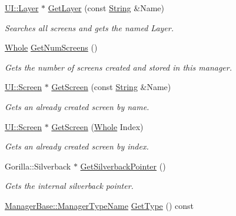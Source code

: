 \begin{DoxyCompactItemize}
\hyperlink{classMezzanine_1_1UI_1_1Layer}{UI::Layer} $\ast$ \hyperlink{classMezzanine_1_1UIManager_abdd684382023792153add6c5766c9e4c}{GetLayer} (const \hyperlink{namespaceMezzanine_acf9fcc130e6ebf08e3d8491aebcf1c86}{String} \&Name)
\begin{DoxyCompactList}\small\item\em Searches all screens and gets the named Layer. \item\end{DoxyCompactList}\item 
\hyperlink{namespaceMezzanine_adcbb6ce6d1eb4379d109e51171e2e493}{Whole} \hyperlink{classMezzanine_1_1UIManager_a847efdfe7496f7bf3aeaef9991a3a631}{GetNumScreens} ()
\begin{DoxyCompactList}\small\item\em Gets the number of screens created and stored in this manager. \item\end{DoxyCompactList}\item 
\hyperlink{classMezzanine_1_1UI_1_1Screen}{UI::Screen} $\ast$ \hyperlink{classMezzanine_1_1UIManager_a11a4962c5f55d915d01a5598afcff6d6}{GetScreen} (const \hyperlink{namespaceMezzanine_acf9fcc130e6ebf08e3d8491aebcf1c86}{String} \&Name)
\begin{DoxyCompactList}\small\item\em Gets an already created screen by name. \item\end{DoxyCompactList}\item 
\hyperlink{classMezzanine_1_1UI_1_1Screen}{UI::Screen} $\ast$ \hyperlink{classMezzanine_1_1UIManager_aa98be268099fc5a68f5a030a61e286d9}{GetScreen} (\hyperlink{namespaceMezzanine_adcbb6ce6d1eb4379d109e51171e2e493}{Whole} Index)
\begin{DoxyCompactList}\small\item\em Gets an already created screen by index. \item\end{DoxyCompactList}\item 
Gorilla::Silverback $\ast$ \hyperlink{classMezzanine_1_1UIManager_a931bcf654541cb3ca43553ae349eab04}{GetSilverbackPointer} ()
\begin{DoxyCompactList}\small\item\em Gets the internal silverback pointer. \item\end{DoxyCompactList}\item 
\hyperlink{classMezzanine_1_1ManagerBase_a08cecf5169cad3e82be81a3a159b0b6e}{ManagerBase::ManagerTypeName} \hyperlink{classMezzanine_1_1UIManager_a0a576d8f14aa475d9f1750b4cf76cf10}{GetType} () const 

\end{DoxyCompactItemize}
